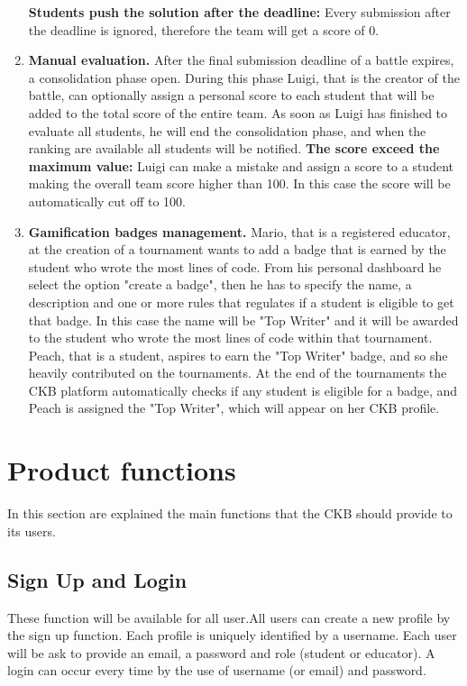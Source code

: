 \begin{enumerate}[label=\textbf{SC.\arabic*}]
    \textbf{Students push the solution after the deadline:} Every submission after the deadline is ignored, therefore the team will get a score of 0. 
    \item {} \textbf{Manual evaluation.} \newline
    After the final submission deadline of a battle expires, a consolidation phase open. During this phase Luigi, that is the creator of the battle, can optionally assign a personal score to each student that will be added to the total score of the entire team.
    As soon as Luigi has finished to evaluate all students, he will end the consolidation phase, and when the ranking are available all students will be notified.\newline
    \textbf{The score exceed the maximum value:} Luigi can make a mistake and assign a score to a student making the overall team score higher than 100. In this case the score will be automatically cut off to 100.
    \item {} \textbf{Gamification badges management.} \newline
    Mario, that is a registered educator, at the creation of a tournament wants to add a badge that is earned by the student who wrote the most lines of code. From his personal dashboard he select the option "create a badge", then he has to specify the name, a description and one or more rules that regulates if a student is eligible to get that badge. In this case the name will be "Top Writer" and it will be awarded to the student who wrote the most lines of code within that tournament. \newline
    Peach, that is a student, aspires to earn the "Top Writer" badge, and so she heavily contributed on the tournaments. At the end of the tournaments the CKB platform automatically checks if any student is eligible for a badge, and Peach is assigned the "Top Writer", which will appear on her CKB profile.
\end{enumerate}

\clearpage

\section{Product functions}\label{desc:prodFunc}
In this section are explained the main functions that the CKB should provide to its users.
\subsection{Sign Up and Login}
These function will be available for all user.\newline All users can create a new profile by the sign up function. Each profile is uniquely identified by a username. Each user will be ask to provide an email, a password and role (student or educator). \newline
A login can occur every time by the use of username (or email) and password.

